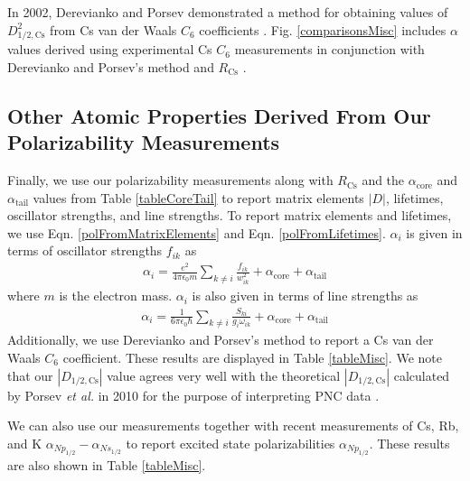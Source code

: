 \documentclass[twocolumn,prl,showpacs,superscriptaddress]{revtex4-1}   %
\newcommand{\figref}[1]{Fig. \ref{#1}}
\newcommand{\eqnref}[1]{Eqn. \eqref{#1}}
\newcommand{\acore}{\alpha_{\textrm{core}}}
\newcommand{\atail}{\alpha_{\textrm{tail}}}
\newcommand{\rcs}{R_{\mathrm{Cs}}}
\newcommand{\etalspace}{\textit{et al. }}
\begin{document}
In 2002, Derevianko and Porsev demonstrated a method for obtaining values of $D_{1/2,\mathrm{Cs}}^2$ from Cs van der Waals $C_6$ coefficients \cite{Derevianko2001}. \figref{comparisonsMisc} includes $\alpha$ values derived using experimental Cs $C_6$ measurements in conjunction with Derevianko and Porsev's method and $\rcs$ \cite{Leo2000,Chin2004,Derevianko2001,Rafac1998}.

\subsection{Other Atomic Properties Derived From Our Polarizability Measurements}

Finally, we use our polarizability measurements along with $\rcs$ and the $\acore$ and $\atail$ values from Table \ref{tableCoreTail} to report matrix elements $|D|$, lifetimes, oscillator strengths, and line strengths. To report matrix elements and lifetimes, we use \eqnref{polFromMatrixElements} and \eqnref{polFromLifetimes}. $\alpha_i$ is given in terms of oscillator strengths $f_{ik}$ as 
\begin{align}
	\alpha_i = \frac{e^2}{4 \pi \epsilon_0 m}
	\sum_{k \neq i}
	\frac{f_{ik}}{w_{ik}^2}
	+ \acore
	+ \atail
	\label{polFromOscStr}
\end{align}
where $m$ is the electron mass. 
$\alpha_i$ is also given in terms of line strengths as
\begin{align}
	\alpha_i = \frac{1}{6\pi\epsilon_0\hbar} 
	\sum_{k \neq i} 
	\frac{S_{ki}}{g_i\omega_{ik}}
	+ \acore
	+ \atail
	\label{polFromLineStr}
\end{align}
Additionally, we use Derevianko and Porsev's method to report a Cs van der Waals $C_6$ coefficient. These results are displayed in Table \ref{tableMisc}. We note that our $\left|D_{1/2,\mathrm{Cs}}\right|$ value agrees very well with the theoretical $\left|D_{1/2,\mathrm{Cs}}\right|$ calculated by Porsev \etalspace in 2010 for the purpose of interpreting PNC data \cite{Porsev2010}.

We can also use our measurements together with recent measurements of Cs, Rb, and K $\alpha_{Np_{1/2}} - \alpha_{Ns_{1/2}}$ \cite{Hunter1991,Miller1994} to report excited state polarizabilities $\alpha_{Np_{1/2}}$. 
These results are also shown in Table \ref{tableMisc}.
\end{document}
